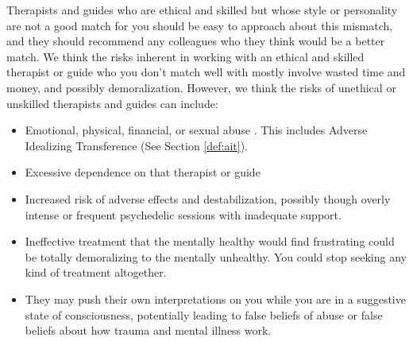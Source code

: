 \documentclass[12pt,letterpaper]{book}
\begin{document}
Therapists and guides who are ethical and skilled but whose style or personality are not a good match for you should be easy to approach about this mismatch, and they should recommend any colleagues who they think would be a better match. We think the risks inherent in working with an ethical and skilled therapist or guide who you don't match well with mostly involve wasted time and money, and possibly demoralization. However, we think the risks of unethical or unskilled therapists and guides can include:
\begin{itemize}
    \item Emotional, physical, financial, or sexual abuse \cite{powerTrip}. This includes Adverse Idealizing Transference (See Section \ref{def:ait}).
    \item Excessive dependence on that therapist or guide \cite{powerTrip}
    \item Increased risk of adverse effects and destabilization, possibly though overly intense or frequent psychedelic sessions with inadequate support.
    \item Ineffective treatment that the mentally healthy would find frustrating could be totally demoralizing to the mentally unhealthy. You could stop seeking any kind of treatment altogether.
    \item They may push their own interpretations on you while you are in a suggestive state of consciousness, potentially leading to false beliefs of abuse \cite{Scoboria07022017} or false beliefs about how trauma and mental illness work.
\end{itemize}
\label{suicideCops}
\end{document}

